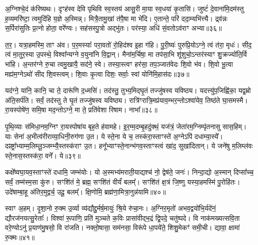 अ॒ग्निश्चे॒दं क॑रिष्यथः। दृꣳह॑स्व देवि पृथिवि स्व॒स्तय॑ आसु॒री मा॒या स्व॒धया॑ कृ॒तासि॑। जुष्टं॑ दे॒वाना॑मि॒दम॑स्तु ह॒व्यमरि॑ष्टा॒ त्वमुदि॑हि य॒ज्ञे अ॒स्मिन्न्। मित्रै॒तामु॒खां त॑पै॒षा मा भे॑दि। ए॒तान्ते॒ परि॑ ददा॒म्यभि॑त्त्यै। द्र्व॑न्नः स॒र्पिरा॑सुतिः प्र॒त्नो होता॒ वरे᳚ण्यः। सह॑सस्पु॒त्रो अद्भु॑तः। पर॑स्या॒ अधि॑ सं॒वतो\-ऽव॑राꣳ अभ्या॥३६॥

त॒र॒। यत्रा॒हमस्मि॒ ताꣳ अ॑व। प॒र॒मस्याः᳚ परा॒वतो॑ रो॒हिद॑श्व इ॒हा ग॑हि। पु॒री॒ष्यः॑ पुरुप्रि॒यो\-ऽग्ने॒ त्वं त॑रा॒ मृधः॑। सीद॒ त्वं मा॒तुर॒स्या उ॒पस्थे॒ विश्वा᳚न्यग्ने व॒युना॑नि वि॒द्वान्। मैना॑म॒र्चिषा॒ मा तप॑सा॒भि शू॑शुचो॒\-ऽन्तर॑स्याꣳ शु॒क्रज्यो॑ति॒र्वि भा॑हि। अ॒न्तर॑ग्ने रु॒चा त्वमु॒खायै॒ सद॑ने॒ स्वे। तस्या॒स्त्वꣳ हर॑सा॒ तप॒ञ्जात॑वेदः शि॒वो भ॑व। शि॒वो भू॒त्वा मह्य॑म॒ग्ने\-ऽथो॑ सीद शि॒वस्त्वम्। शि॒वाः कृ॒त्वा दिशः॒ सर्वाः॒ स्वां योनि॑मि॒हास॑दः॥३७॥

{\anuvakamend[{वी॒रय॒स्वा तप॑न्विꣳश॒तिश्च॑॥९॥}]}

यद॑ग्ने॒ यानि॒ कानि॒ चा ते॒ दारू॑णि द॒ध्मसि॑। तद॑स्तु॒ तुभ्य॒मिद्घृ॒तं तज्जु॑षस्व यविष्ठ्य। यदत्त्यु॑प॒जिह्वि॑का॒ यद्व॒म्रो अ॑ति॒सर्प॑ति। सर्वं॒ तद॑स्तु ते घृ॒तं तज्जु॑षस्व यविष्ठ्य। रात्रि॑ꣳरात्रि॒मप्र॑याव॒म्भर॒न्तो\-ऽश्वा॑येव॒ तिष्ठ॑ते घा॒समस्मै। रा॒यस्पोषे॑ण॒ समि॒षा मद॒न्तो\-ऽग्ने॒ मा ते॒ प्रति॑वेशा रिषाम। नाभा᳚॥३८॥

पृ॒थि॒व्याः स॑मिधा॒नम॒ग्निꣳ रा॒यस्पोषा॑य बृह॒ते ह॑वामहे। इ॒र॒म्म॒दम्बृ॒हदु॑क्थं॒ यज॑त्रं॒ जेता॑रम॒ग्निम्पृ॑तनासु सास॒हिम्। याः सेना॑ अ॒भीत्व॑रीराव्या॒धिनी॒रुग॑णा उ॒त। ये स्ते॒ना ये च॒ तस्क॑रा॒स्ताꣳस्ते॑ अ॒ग्ने\-ऽपि॑ दधाम्या॒स्ये᳚। दꣴष्ट्रा᳚भ्याम्म॒लिम्लू॒ञ्जम्भ्यै॒स्तस्क॑राꣳ उ॒त। हनू᳚भ्याꣳस्ते॒नान्भ॑गव॒स्ताꣳस्त्वं खा॑द॒ सुखा॑दितान्। ये जने॑षु म॒लिम्ल॑वः स्ते॒नास॒स्तस्क॑रा॒ वने᳚। ये॥३९॥

कक्षे᳚ष्वघा॒यव॒स्ताꣳस्ते॑ दधामि॒ जम्भ॑योः। यो अ॒स्मभ्य॑मराती॒याद्यश्च॑ नो॒ द्वेष॑ते॒ जनः॑। निन्दा॒द्यो अ॒स्मान् दिप्सा᳚च्च॒ सर्वं॒ तम्म॑स्म॒सा कु॑रु। सꣳशि॑तं मे॒ ब्रह्म॒ सꣳशि॑तं वीर्यं॑ बलम्᳚। सꣳशि॑तं क्ष॒त्रं जि॒ष्णु यस्या॒हमस्मि॑ पु॒रोहि॑तः। उदे॑षाम्बा॒हू अ॑तिर॒मुद्वर्च॒ उदू॒ बलम्᳚। क्षि॒णोमि॒ ब्रह्म॑णा॒मित्रा॒नुन्न॑यामि॥४०॥

स्वाꣳ अ॒हम्। दृ॒शा॒नो रु॒क्म उ॒र्व्या व्य॑द्यौद्दु॒र्मर्\mbox{}ष॒मायुः॑ श्रि॒ये रु॑चा॒नः। अ॒ग्निर॒मृतो॑ अभव॒द्वयो॑भि॒र्यदे॑नं॒ द्यौरज॑नयत्सु॒रेताः᳚। विश्वा॑ रू॒पाणि॒ प्रति॑ मुञ्चते क॒विः प्रासा॑वीद्भ॒द्रं द्वि॒पदे॒ चतु॑ष्पदे। वि नाक॑मख्यत्सवि॒ता वरे॒ण्यो\-ऽनु॑ प्र॒याण॑मु॒षसो॒ वि रा॑जति। नक्तो॒षासा॒ सम॑नसा॒ विरू॑पे धा॒पये॑ते॒ शिशु॒मेकꣳ॑ समी॒ची। द्यावा॒ क्षामा॑ रु॒क्मः॥४१॥

